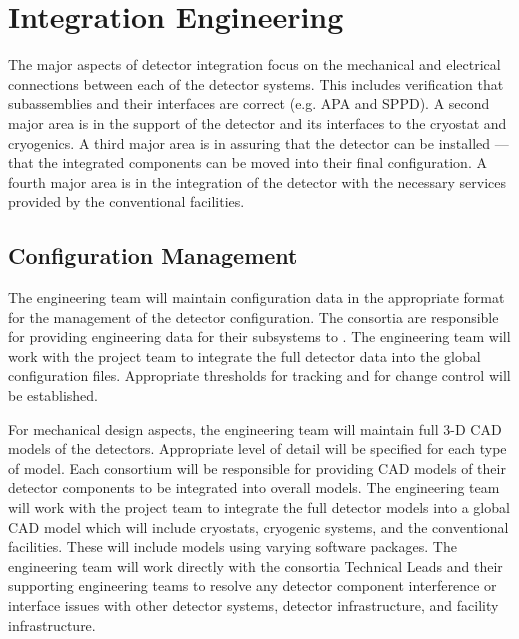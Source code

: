 \section{Integration Engineering}
\label{sec:fdsp-coord-integ-sysengr}

The major aspects of detector integration focus on the mechanical and
electrical connections between each of the detector systems. This
includes verification that subassemblies and their interfaces are
correct (e.g. APA and SPPD). A second major area is in the support of
the detector and its interfaces to the cryostat and cryogenics. A
third major area is in assuring that the detector can be installed ---
that the integrated components can be moved into their final
configuration. A fourth major area is in the integration of the
detector with the necessary services provided by the conventional
facilities.

\subsection{Configuration Management}
\label{sec:fdsp-coord-integ-config}

The  engineering team will maintain
configuration data in the appropriate format for the management of the
detector configuration. The consortia are responsible for providing
engineering data for their subsystems to . The
 engineering team will work with the  project team to
integrate the full detector data into the global 
configuration files. Appropriate thresholds for tracking and for
change control will be established.

For mechanical design aspects, the  engineering team
will maintain full 3-D CAD models of the detectors. Appropriate level
of detail will be specified for each type of model. Each consortium
will be responsible for providing CAD models of their detector
components to be integrated into overall models. The  engineering
team will work with the  project team to integrate the
full detector models into a global  CAD model which will
include cryostats, cryogenic systems, and the conventional
facilities. These will include models using varying software
packages. The  engineering team will work directly with the
consortia Technical Leads and their supporting engineering teams to
resolve any detector component interference or interface issues with
other detector systems, detector infrastructure, and facility
infrastructure.

